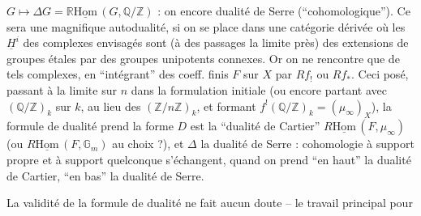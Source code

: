 $G\longmapsto\Delta G=\mathbb{R}\underline{\mathrm{Hom}}\,(G,\mathbb{Q}/\mathbb{Z})$ : on  encore dualité de Serre (``cohomologique''). Ce sera une magnifique autodualité, si on se place dans une catégorie dérivée où les $\underline{H}^{i}$ des complexes envisagés sont (à des passages  la limite près) des extensions de groupes étales par des groupes unipotents connexes. Or on ne rencontre que de tels complexes, en ``intégrant'' des coeff. finis $F$ sur $X$ par $Rf_!$ ou $Rf_*$. Ceci posé, passant à la limite sur $n$ dans la formulation initiale (ou encore partant avec $(\mathbb{Q}/\mathbb{Z})_k$ sur $k$, au lieu des $(\mathbb{Z}/n\mathbb{Z})_k$, et formant $f^!(\mathbb{Q}/\mathbb{Z})_k=(\mu_\infty)_X$), la formule de dualité prend la forme
 $D$ est la ``dualité de Cartier'' $R\underline{\mathrm{Hom}}\,(F,\mu_\infty)$ (ou $R\underline{\mathrm{Hom}}\,(F,\mathbb{G}_m)$ au choix ?), et $\Delta$ la dualité de Serre : cohomologie à support propre et à support quelconque s'échangent, quand on prend ``en haut'' la dualité de Cartier, ``en bas'' la dualité de Serre.

La validité de la formule de dualité ne fait aucun doute -- le travail principal pour
